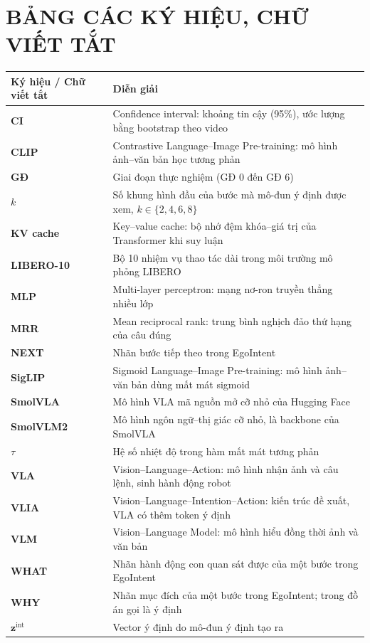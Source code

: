 \documentclass[a4paper,oneside]{report}
\begin{document}
\chapter*{BẢNG CÁC KÝ HIỆU, CHỮ VIẾT TẮT}
\begin{center}
\small{}
\begin{tabularx}{\linewidth}{>{\bfseries}l X}
\toprule
Ký hiệu / Chữ viết tắt & Diễn giải \\
\midrule
CI & Confidence interval: khoảng tin cậy (95\%), ước lượng bằng bootstrap theo video \\
CLIP & Contrastive Language--Image Pre-training: mô hình ảnh--văn bản học tương phản \\
GĐ & Giai đoạn thực nghiệm (GĐ 0 đến GĐ 6) \\
$k$ & Số khung hình đầu của bước mà mô-đun ý định được xem, $k\in\{2,4,6,8\}$ \\
KV cache & Key--value cache: bộ nhớ đệm khóa--giá trị của Transformer khi suy luận \\
LIBERO-10 & Bộ 10 nhiệm vụ thao tác dài trong môi trường mô phỏng LIBERO \\
MLP & Multi-layer perceptron: mạng nơ-ron truyền thẳng nhiều lớp \\
MRR & Mean reciprocal rank: trung bình nghịch đảo thứ hạng của câu đúng \\
NEXT & Nhãn bước tiếp theo trong EgoIntent \\
SigLIP & Sigmoid Language--Image Pre-training: mô hình ảnh--văn bản dùng mất mát sigmoid \\
SmolVLA & Mô hình VLA mã nguồn mở cỡ nhỏ của Hugging Face \\
SmolVLM2 & Mô hình ngôn ngữ--thị giác cỡ nhỏ, là backbone của SmolVLA \\
$\tau$ & Hệ số nhiệt độ trong hàm mất mát tương phản \\
VLA & Vision--Language--Action: mô hình nhận ảnh và câu lệnh, sinh hành động robot \\
VLIA & Vision--Language--Intention--Action: kiến trúc đề xuất, VLA có thêm token ý định \\
VLM & Vision--Language Model: mô hình hiểu đồng thời ảnh và văn bản \\
WHAT & Nhãn hành động con quan sát được của một bước trong EgoIntent \\
WHY & Nhãn mục đích của một bước trong EgoIntent; trong đồ án gọi là ý định \\
$\mathbf{z}^{\mathrm{int}}$ & Vector ý định do mô-đun ý định tạo ra \\
\bottomrule
\end{tabularx}
\end{center}
\end{document}
